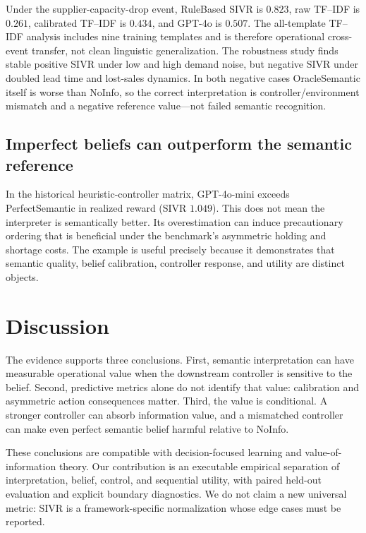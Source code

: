\documentclass[10pt]{article}
\begin{document}
Under the supplier-capacity-drop event, RuleBased SIVR is $0.823$, raw TF--IDF is $0.261$, calibrated TF--IDF is $0.434$, and GPT-4o is $0.507$. The all-template TF--IDF analysis includes nine training templates and is therefore operational cross-event transfer, not clean linguistic generalization. The robustness study finds stable positive SIVR under low and high demand noise, but negative SIVR under doubled lead time and lost-sales dynamics. In both negative cases OracleSemantic itself is worse than NoInfo, so the correct interpretation is controller/environment mismatch and a negative reference value—not failed semantic recognition.

\subsection{Imperfect beliefs can outperform the semantic reference}

In the historical heuristic-controller matrix, GPT-4o-mini exceeds PerfectSemantic in realized reward (SIVR $1.049$). This does not mean the interpreter is semantically better. Its overestimation can induce precautionary ordering that is beneficial under the benchmark's asymmetric holding and shortage costs. The example is useful precisely because it demonstrates that semantic quality, belief calibration, controller response, and utility are distinct objects.

\section{Discussion}

The evidence supports three conclusions. First, semantic interpretation can have measurable operational value when the downstream controller is sensitive to the belief. Second, predictive metrics alone do not identify that value: calibration and asymmetric action consequences matter. Third, the value is conditional. A stronger controller can absorb information value, and a mismatched controller can make even perfect semantic belief harmful relative to NoInfo.

These conclusions are compatible with decision-focused learning and value-of-information theory. Our contribution is an executable empirical separation of interpretation, belief, control, and sequential utility, with paired held-out evaluation and explicit boundary diagnostics. We do not claim a new universal metric: SIVR is a framework-specific normalization whose edge cases must be reported.
\end{document}
